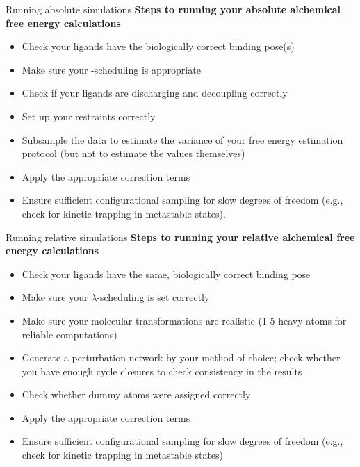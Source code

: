 \documentclass[9pt,bestpractices]{livecoms}
\begin{document}
\begin{Checklists*}
\begin{checklist}{Running absolute simulations}
        \textbf{Steps to running your absolute alchemical free energy calculations}
\begin{itemize}
 \item Check your ligands have the biologically correct binding pose(s)
        \item Make sure your \textlambda-scheduling is  appropriate
        \item Check if your ligands are discharging and decoupling correctly
        \item Set up your restraints correctly
        \item Subsample the data to estimate the variance of your free energy estimation protocol (but not to estimate the values themselves)
        \item Apply the appropriate correction terms
        \item Ensure sufficient configurational sampling for slow degrees of freedom (e.g., check for kinetic trapping in metastable states).
\end{itemize}
\end{checklist}

\begin{checklist}{Running relative simulations}
        \textbf{Steps to running your relative alchemical free energy calculations}
\begin{itemize}
   \item Check your ligands  have the same, biologically correct binding pose
        \item Make sure your $\lambda$-scheduling is set correctly
        \item Make sure your molecular transformations are realistic (1-5 heavy atoms for reliable computations)
        \item Generate a perturbation network by your method of choice; check whether you have enough cycle closures to check consistency in the results
        \item Check whether dummy atoms were assigned correctly
         \item Apply the appropriate correction terms
         \item Ensure sufficient configurational sampling for slow degrees of freedom (e.g., check for kinetic trapping in metastable states)
\end{itemize}
\end{checklist}
\end{Checklists*}
\end{document}
